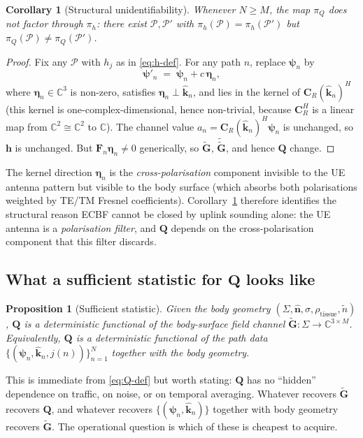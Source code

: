 \documentclass[11pt,a4paper]{article}
\newtheorem{proposition}[theorem]{Proposition}
\newtheorem{corollary}[theorem]{Corollary}
\theoremstyle{definition}
\newcommand{\hh}{\mathbf{h}}
\newcommand{\nh}{\hat{\mathbf{n}}}
\newcommand{\kh}{\hat{\mathbf{k}}}
\newcommand{\Q}{\mathbf{Q}}
\newcommand{\Gt}{\tilde{\mathbf{G}}}
\newcommand{\F}{\mathbf{F}}
\newcommand{\Cp}{\mathbf{C}}
\newcommand{\psib}{\boldsymbol{\psi}}
\newcommand{\Sigmaset}{\Sigma}
\newcommand{\C}{\mathbb{C}}
\begin{document}
\begin{corollary}[Structural unidentifiability]
\label{cor:structural-unid}
Whenever $N\ge M$, the map $\pi_Q$ does not factor through $\pi_h$: there
exist $\mathcal{P},\mathcal{P}'$ with
$\pi_h(\mathcal{P})=\pi_h(\mathcal{P}')$ but
$\pi_Q(\mathcal{P})\ne\pi_Q(\mathcal{P}')$.
\end{corollary}

\begin{proof}
Fix any $\mathcal{P}$ with $h_j$ as in \eqref{eq:h-def}.
For any path $n$, replace $\psib_n$ by
\[
  \psib'_n \;=\; \psib_n + c\,\boldsymbol{\eta}_n,
\]
where $\boldsymbol{\eta}_n\in\C^3$ is non-zero, satisfies
$\boldsymbol{\eta}_n\perp\kh_n$, and lies in the kernel of
$\Cp_R(\kh_n)^H$ (this kernel is one-complex-dimensional, hence non-trivial,
because $\Cp_R^H$ is a linear map from $\C^2\cong\C^2$ to $\C$).
The channel value $a_n=\Cp_R(\kh_n)^H\psib_n$ is unchanged, so $\hh$ is
unchanged. But $\F_n\boldsymbol{\eta}_n\ne 0$ generically, so
$\Gt$, $\tilde{\Gt}$, and hence $\Q$ change.
\end{proof}

The kernel direction $\boldsymbol{\eta}_n$ is the
\emph{cross-polarisation} component invisible to the UE antenna pattern but
visible to the body surface (which absorbs both polarisations weighted by
TE/TM Fresnel coefficients). Corollary~\ref{cor:structural-unid} therefore
identifies the structural reason ECBF cannot be closed by uplink sounding
alone: the UE antenna is a \emph{polarisation filter}, and $\Q$ depends on
the cross-polarisation component that this filter discards.

\subsection{What a sufficient statistic for $\Q$ looks like}

\begin{proposition}[Sufficient statistic]
\label{prop:sufficient}
Given the body geometry $(\Sigmaset,\nh,\sigma,\rho_{\mathrm{tissue}},\tilde n)$,
$\Q$ is a deterministic functional of the body-surface field channel
$\Gt:\Sigmaset\to\C^{3\times M}$. Equivalently, $\Q$ is a deterministic
functional of the path data $\{(\psib_n,\kh_n,j(n))\}_{n=1}^N$ together
with the body geometry.
\end{proposition}

This is immediate from \eqref{eq:Q-def} but worth stating: $\Q$ has no
``hidden'' dependence on traffic, on noise, or on temporal averaging.
Whatever recovers $\Gt$ recovers $\Q$, and whatever recovers
$\{(\psib_n,\kh_n)\}$ together with body geometry recovers $\Gt$.
The operational question is which of these is cheapest to acquire.
\end{document}
